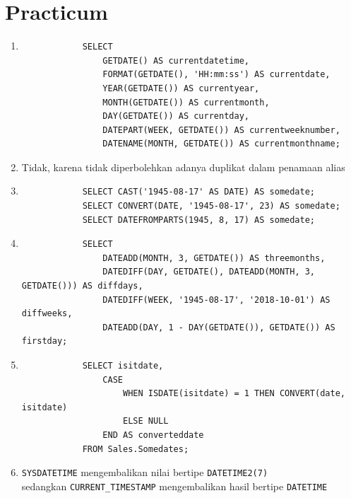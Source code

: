 \documentclass[12pt,titlepage]{article}
\begin{document}
\section{Practicum}
\begin{enumerate}
    \item {
        \begin{verbatim}
            SELECT
                GETDATE() AS currentdatetime,
                FORMAT(GETDATE(), 'HH:mm:ss') AS currentdate,
                YEAR(GETDATE()) AS currentyear,
                MONTH(GETDATE()) AS currentmonth,
                DAY(GETDATE()) AS currentday,
                DATEPART(WEEK, GETDATE()) AS currentweeknumber,
                DATENAME(MONTH, GETDATE()) AS currentmonthname;
        \end{verbatim}
    }
    \item {
        Tidak, karena tidak diperbolehkan adanya duplikat dalam penamaan alias
    }
    \item {
        \begin{verbatim}
            SELECT CAST('1945-08-17' AS DATE) AS somedate;
            SELECT CONVERT(DATE, '1945-08-17', 23) AS somedate;
            SELECT DATEFROMPARTS(1945, 8, 17) AS somedate;
        \end{verbatim}
    }
    \item {
        \begin{verbatim}
            SELECT
                DATEADD(MONTH, 3, GETDATE()) AS threemonths,
                DATEDIFF(DAY, GETDATE(), DATEADD(MONTH, 3, GETDATE())) AS diffdays,
                DATEDIFF(WEEK, '1945-08-17', '2018-10-01') AS diffweeks,
                DATEADD(DAY, 1 - DAY(GETDATE()), GETDATE()) AS firstday;
        \end{verbatim}
    }
    \item {
        \begin{verbatim}
            SELECT isitdate,
                CASE
                    WHEN ISDATE(isitdate) = 1 THEN CONVERT(date, isitdate)
                    ELSE NULL
                END AS converteddate
            FROM Sales.Somedates;
        \end{verbatim}
    }
    \item {
        \texttt{SYSDATETIME} mengembalikan nilai bertipe \texttt{DATETIME2(7)}
        \\ sedangkan \texttt{CURRENT\_TIMESTAMP} mengembalikan hasil bertipe \texttt{DATETIME}
}
\end{enumerate}
\end{document}
